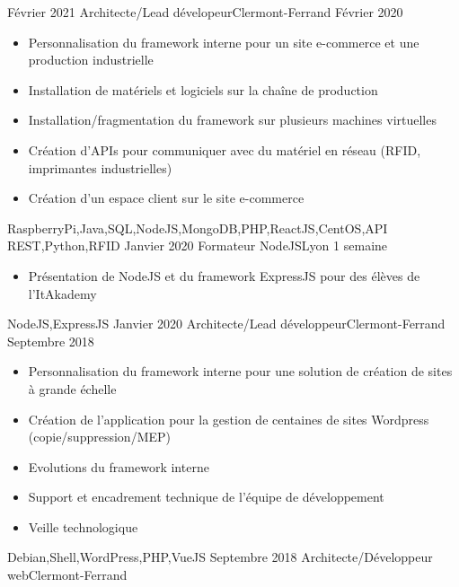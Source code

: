 \begin{experiences}
  \emptySeparator
  \experience
    {Février 2021} {Architecte/Lead dévelopeur}{}{Clermont-Ferrand}
    {Février 2020}    {
                      \begin{itemize}
			\item Personnalisation du framework interne pour un site e-commerce et une production industrielle
			\item Installation de matériels et logiciels sur la chaîne de production
			\item Installation/fragmentation du framework sur plusieurs machines virtuelles
			\item Création d'APIs pour communiquer avec du matériel en réseau (RFID, imprimantes industrielles)
			\item Création d'un espace client sur le site e-commerce
                      \end{itemize}
                    }
                    {RaspberryPi,Java,SQL,NodeJS,MongoDB,PHP,ReactJS,CentOS,API REST,Python,RFID}
  \emptySeparator
  \experience
    {Janvier 2020}     {Formateur NodeJS}{}{Lyon}
    {1 semaine}    {
                      \begin{itemize}
			\item Présentation de NodeJS et du framework ExpressJS pour des élèves de l'ItAkademy
                      \end{itemize}
                    }
                    {NodeJS,ExpressJS}
  \emptySeparator
  \experience
  {Janvier 2020}       {Architecte/Lead développeur}{}{Clermont-Ferrand}
  {Septembre 2018}  {
                      \begin{itemize}
			\item Personnalisation du framework interne pour une solution de création de sites à grande échelle
			\item Création de l'application pour la gestion de centaines de sites Wordpress (copie/suppression/MEP)
			\item Evolutions du framework interne
                        \item Support et encadrement technique de l'équipe de développement                           
			\item Veille technologique
                      \end{itemize}
                    }
                    {Debian,Shell,WordPress,PHP,VueJS}
  \emptySeparator         
  \experience
  {Septembre 2018}  {Architecte/Développeur web}{}{Clermont-Ferrand}

\end{experiences}
